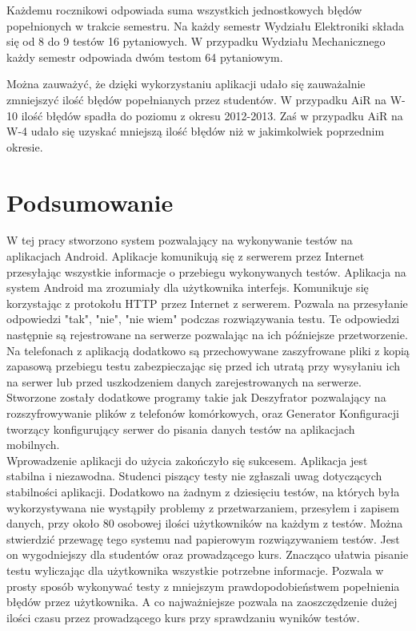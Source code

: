 \documentclass[eng]{mgr}
\begin{document}
		Każdemu rocznikowi odpowiada suma wszystkich jednostkowych błędów popełnionych w trakcie semestru. Na każdy semestr Wydziału Elektroniki składa się od 8 do 9 testów 16 pytaniowych. W przypadku Wydziału Mechanicznego każdy semestr odpowiada dwóm testom 64 pytaniowym.
		
		Można zauważyć, że dzięki wykorzystaniu aplikacji udało się zauważalnie zmniejszyć ilość błędów popełnianych przez studentów. W przypadku AiR na W-10 ilość błędów spadła do poziomu z okresu 2012-2013. Zaś w przypadku AiR na W-4 udało się uzyskać mniejszą ilość błędów niż w jakimkolwiek poprzednim okresie.
		
	\chapter{Podsumowanie}
	
	W tej pracy stworzono system pozwalający na wykonywanie testów na aplikacjach Android. Aplikacje komunikują się z serwerem przez Internet przesyłając wszystkie informacje o przebiegu wykonywanych testów. Aplikacja na system Android ma zrozumiały dla użytkownika interfejs. Komunikuje się korzystając z protokołu HTTP przez Internet z serwerem. Pozwala na przesyłanie odpowiedzi "tak", "nie", "nie wiem" podczas rozwiązywania testu. Te odpowiedzi następnie są rejestrowane na serwerze pozwalając na ich późniejsze przetworzenie. Na telefonach z aplikacją dodatkowo są przechowywane zaszyfrowane pliki z kopią zapasową przebiegu testu zabezpieczając się przed ich utratą przy wysyłaniu ich na serwer lub przed uszkodzeniem danych zarejestrowanych na serwerze. Stworzone zostały dodatkowe programy takie jak Deszyfrator pozwalający na rozszyfrowywanie plików z telefonów komórkowych, oraz Generator Konfiguracji tworzący konfigurujący serwer do pisania danych testów na aplikacjach mobilnych.\\
	
	Wprowadzenie aplikacji do użycia zakończyło się sukcesem. Aplikacja jest stabilna i niezawodna. Studenci piszący testy nie zgłaszali uwag dotyczących stabilności aplikacji. Dodatkowo na żadnym z dziesięciu testów, na których była wykorzystywana nie wystąpiły problemy z przetwarzaniem, przesyłem i zapisem danych, przy około 80 osobowej ilości użytkowników na każdym z testów. Można stwierdzić przewagę tego systemu nad papierowym rozwiązywaniem testów. Jest on wygodniejszy dla studentów oraz prowadzącego kurs. Znacząco ułatwia pisanie testu wyliczając dla użytkownika wszystkie potrzebne informacje. Pozwala w prosty sposób wykonywać testy z mniejszym prawdopodobieństwem popełnienia błędów przez użytkownika. A co najważniejsze pozwala na zaoszczędzenie dużej ilości czasu przez prowadzącego kurs przy sprawdzaniu wyników testów.\\
	
\end{document}
